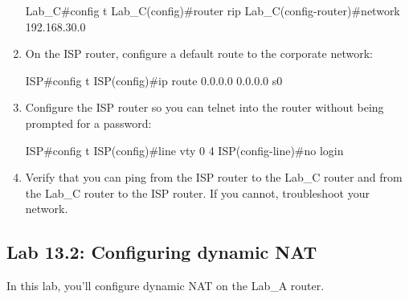\begin{enumerate}
\begin{cli}
Lab_C#config t
Lab_C(config)#router rip
Lab_C(config-router)#network 192.168.30.0
\end{cli}
\item
  On the ISP router, configure a default route to the corporate network:

\begin{cli}
ISP#config t
ISP(config)#ip route 0.0.0.0 0.0.0.0 s0
\end{cli}
\item
  Configure the ISP router so you can telnet into the router without
  being prompted for a password:

\begin{cli}
ISP#config t
ISP(config)#line vty 0 4
ISP(config-line)#no login
\end{cli}
\item
  Verify that you can ping from the ISP router to the Lab\_C router and
  from the Lab\_C router to the ISP router. If you cannot, troubleshoot
  your network.
\end{enumerate}




\subsection{Lab 13.2: Configuring dynamic NAT}

In this lab, you'll configure dynamic NAT on the Lab\_A router.

